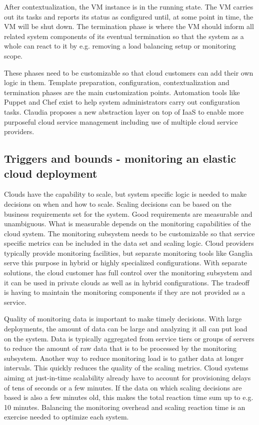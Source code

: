 \documentclass[english]{tktltiki2}
\theoremstyle{definition}
\theoremstyle{remark}
\begin{document}
After contextualization, the VM instance is in the running state. The VM carries
out its tasks and reports its status as configured until, at some point in time,
the VM will be shut down. The termination phase is where the VM should inform
all related system components of its eventual termination so that the system as
a whole can react to it by e.g. removing a load balancing setup or monitoring
scope.

These phases need to be customizable so that cloud customers can add their own
logic in them. Template preparation, configuration, contextualization and
termination phases are the main customization points. Automation tools like
Puppet \cite{puppetlabswebsite} and Chef \cite{chefwebsite} exist to help system
administrators carry out configuration tasks. Claudia \cite{frominfratoservice}
proposes a new abstraction layer on top of IaaS to enable more purposeful cloud
service management including use of multiple cloud service providers.

\subsection{Triggers and bounds - monitoring an elastic cloud deployment}

Clouds have the capability to scale, but system specific logic is needed to make
decisions on when and how to scale. Scaling decisions can be based on the
business requirements set for the system. Good requirements are measurable and
unambiguous. What is measurable depends on the monitoring capabilities of the
cloud system. The monitoring subsystem needs to be customizable so that service
specific metrics can be included in the data set and scaling logic. Cloud
providers typically provide monitoring facilities, but separate monitoring tools
like Ganglia \cite{gangliapaper} serve this purpose in hybrid or highly
specialized configurations. With separate solutions, the cloud customer has full
control over the monitoring subsystem and it can be used in private clouds as
well as in hybrid configurations. The tradeoff is having to maintain the monitoring components if they are not provided as a service.

Quality of monitoring data is important to make timely decisions. With large
deployments, the amount of data can be large and analyzing it all can put load
on the system. Data is typically aggregated from service tiers or groups of
servers to reduce the amount of raw data that is to be processed by the
monitoring subsystem. Another way to reduce monitoring load is to gather data at
longer intervals. This quickly reduces the quality of the scaling metrics. Cloud
systems aiming at just-in-time scalability already have to account for
provisioning delays of tens of seconds or a few minutes. If the data on which
scaling decisions are based is also a few minutes old, this makes the total
reaction time sum up to e.g. 10 minutes. Balancing the monitoring overhead and
scaling reaction time is an exercise needed to optimize each system.
\end{document}
